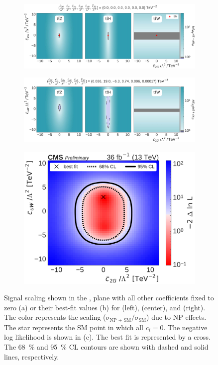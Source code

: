 \begin{figure}
  \vspace{-1cm}
  \begin{subfigure}{\linewidth}
    \centering
    \includegraphics[width=\linewidth]{figures/thirteen-TeV/scaling-frozen/c2G_cuW}
    \caption{}
  \end{subfigure}
  \begin{subfigure}{\linewidth}
    \centering
    \includegraphics[width=\linewidth]{figures/thirteen-TeV/scaling/c2G_cuW}
    \caption{}
  \end{subfigure}
  \begin{subfigure}{\linewidth}
    \centering
    \includegraphics[width=0.6\linewidth]{figures/thirteen-TeV/nll/c2G_cuW}
    \caption{}
  \end{subfigure}
  \vspace{-1cm}
  \setlength{\capwidth}{15cm}
  \caption[Signal scaling and profile likelihood scan in the \cuW, \ctwoG plane]{Signal scaling
  shown in the \cuW, \ctwoG plane with all other coefficients fixed to zero (a) or their best-fit
  values (b) for \ttZ (left), \ttH (center), and \ttW (right). The color represents the scaling
  ($\sigma_\text{NP + SM} / \sigma_\text{SM}$) due to NP effects. The star represents the SM point in
  which all $c_i=0$. The negative log likelihood is shown in (c). The best fit is represented by a
  cross. The \SI{68}{\percent} and \SI{95}{\percent} CL contours are shown with dashed and solid
  lines, respectively.}
\end{figure}

